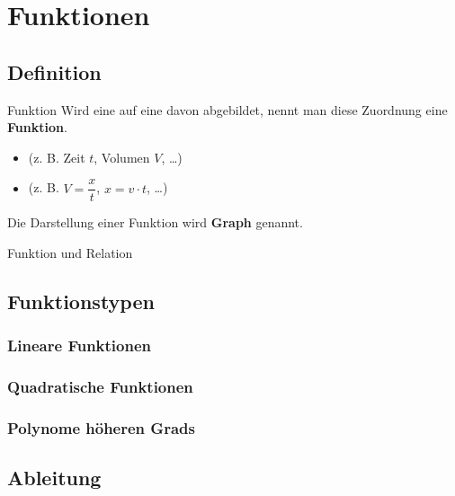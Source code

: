 
\section{Funktionen}

\subsection{Definition}

\begin{Definition}{Funktion}{}
    Wird eine  auf eine davon  abgebildet, nennt man diese Zuordnung eine \textbf{Funktion}.
    \begin{itemize}[leftmargin=*]
        \item {} (z. B. Zeit $t$, Volumen $V$, \dots)
        \item {} (z. B. $V = \dfrac{x}{t}$, $x = v \cdot t$, \dots)
    \end{itemize}
    Die Darstellung einer Funktion wird \textbf{Graph} genannt.
\end{Definition}

Funktion und Relation

\subsection{Funktionstypen}

\subsubsection{Lineare Funktionen}

\subsubsection{Quadratische Funktionen}

\subsubsection{Polynome höheren Grads}

\subsection{Ableitung}

